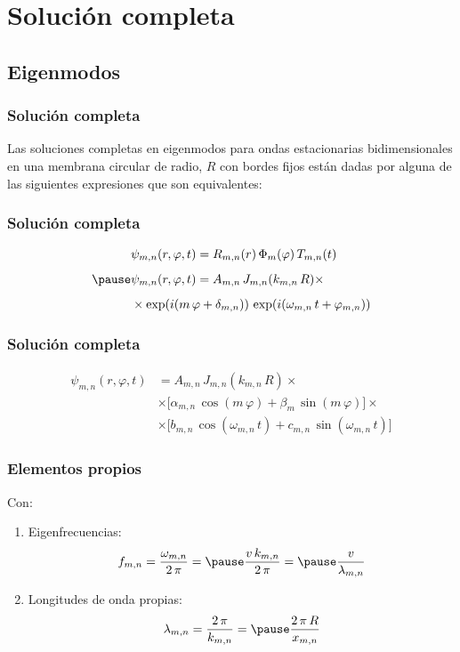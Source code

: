 \documentclass[12pt]{beamer}
\begin{document}
\section{Solución completa}
\subsection{Eigenmodos}

\begin{frame}
\frametitle{Solución completa}
Las soluciones completas en eigenmodos para ondas estacionarias bidimensionales en una membrana circular de radio, $R$ con bordes fijos están dadas por alguna de las siguientes expresiones que son equivalentes:
\end{frame}
\begin{frame}
\frametitle{Solución completa}
\begin{eqnarray*}
\begin{aligned}
&\psi_{m,n} (r ,\varphi, t) = R_{m,n} (r) \, \Phi_{m} (\varphi) \, T_{m,n} (t) \\[0.5em] \pause
&\psi_{m,n} (r ,\varphi, t) = A_{m,n} \, J_{m,n} (k_{m,n} \, R) \times \\[0.5em]
&\times \exp(i(m \, \varphi + \delta_{m,n})) \, \exp(i(\omega_{m,n} \, t + \varphi_{m,n}))
\end{aligned}
\end{eqnarray*}
\end{frame}
\begin{frame}
\frametitle{Solución completa}
\begin{align*}
\psi_{m,n} (r ,\varphi, t) &= A_{m,n} \, J_{m,n} (k_{m,n} \, R) \times \\[0.5em]
&\times \big[ \alpha_{m,n} \,  \cos (m \, \varphi) + \beta_{m} \, \sin (m \, \varphi) \big] \times \\[0.5em]
&\times \big[ b_{m,n} \,  \cos (\omega_{m,n} \, t) + c_{m,n} \, \sin (\omega_{m,n} \, t) \big]
\end{align*}   
\end{frame}
\begin{frame}
\frametitle{Elementos propios}
Con:
\begin{enumerate}[<+->]
\item Eigenfrecuencias:
\begin{eqnarray*}
f_{m,n} = \dfrac{\omega_{m,n}}{2 \, \pi} = \pause \dfrac{v \, k_{m,n}}{2 \, \pi} = \pause \dfrac{v}{\lambda_{m,n}}
\end{eqnarray*}
\item Longitudes de onda propias:
\begin{eqnarray*}
\lambda_{m,n} = \dfrac{2 \, \pi}{k_{m,n}} = \pause \dfrac{2 \, \pi \, R}{x_{m,n}}
\end{eqnarray*}
\seti
\end{enumerate}
\end{frame}
\end{document}
